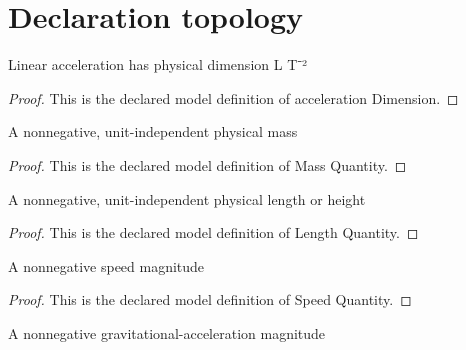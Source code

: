 \section{Declaration topology}
\begin{definition}
  \label{def:physics:phyx-mini-0811:phyxminiproblems-problemphyxmini0811-accelerationdimension}
  Linear acceleration has physical dimension L T⁻²
\end{definition}
\begin{proof}
  This is the declared model definition of acceleration Dimension.
\end{proof}
\begin{definition}
  \label{def:physics:phyx-mini-0811:phyxminiproblems-problemphyxmini0811-massquantity}
  A nonnegative, unit-independent physical mass
\end{definition}
\begin{proof}
  This is the declared model definition of Mass Quantity.
\end{proof}
\begin{definition}
  \label{def:physics:phyx-mini-0811:phyxminiproblems-problemphyxmini0811-lengthquantity}
  A nonnegative, unit-independent physical length or height
\end{definition}
\begin{proof}
  This is the declared model definition of Length Quantity.
\end{proof}
\begin{definition}
  \label{def:physics:phyx-mini-0811:phyxminiproblems-problemphyxmini0811-speedquantity}
  A nonnegative speed magnitude
\end{definition}
\begin{proof}
  This is the declared model definition of Speed Quantity.
\end{proof}
\begin{definition}
  \label{def:physics:phyx-mini-0811:phyxminiproblems-problemphyxmini0811-accelerationquantity}
  A nonnegative gravitational-acceleration magnitude
\end{definition}
